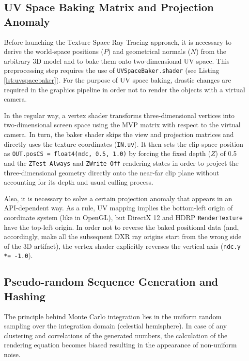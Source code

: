 \subsection{UV Space Baking Matrix and Projection Anomaly}

Before launching the Texture Space Ray Tracing approach, it is necessary to derive the world-space positions ($P$) and geometrical normals ($N$) from the arbitrary 3D model and to bake them onto two-dimensional UV space. This preprocessing step requires the use of \texttt{UVSpaceBaker.shader} (see Listing \ref{lst:uvspacebaker}). For the purpose of UV space baking, drastic changes are required in the graphics pipeline in order not to render the objects with a virtual camera.

In the regular way, a vertex shader transforms three-dimensional vertices into two-dimensional screen space using the MVP matrix with respect to the virtual camera. In turn, the baker shader skips the view and projection matrices and directly uses the texture coordinates (\texttt{IN.uv}). It then sets the clip-space position as \texttt{OUT.posCS = float4(ndc, 0.5, 1.0)} by forcing the fixed depth ($Z$) of 0.5 and the \texttt{ZTest Always} and \texttt{ZWrite Off} rendering states in order to project the three-dimensional geometry directly onto the near-far clip plane without accounting for its depth and usual culling process.

Also, it is necessary to solve a certain projection anomaly that appears in an API-dependent way. As a rule, UV mapping implies the bottom-left origin of coordinate system (like in OpenGL), but DirectX 12 and HDRP \texttt{RenderTexture} have the top-left origin. In order not to reverse the baked positional data (and, accordingly, make all the subsequent DXR ray origins start from the wrong side of the 3D artifact), the vertex shader explicitly reverses the vertical axis (\texttt{ndc.y *= -1.0}).

\subsection{Pseudo-random Sequence Generation and Hashing}

The principle behind Monte Carlo integration lies in the uniform random sampling over the integration domain (celestial hemisphere). In case of any clustering and correlations of the generated numbers, the calculation of the rendering equation becomes biased resulting in the appearance of non-uniform noise.

